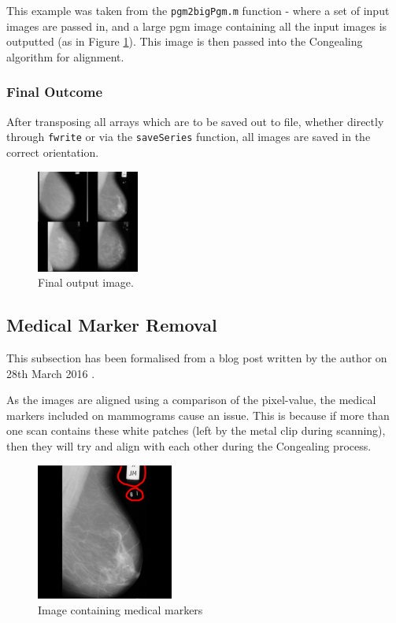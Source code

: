 This example was taken from the \texttt{pgm2bigPgm.m} function - where a set of input images are passed in, and a large pgm image containing all the input images is outputted (as in Figure \ref{fig:final-output-4}). This image is then passed into the \Gls{Congealing} algorithm for alignment.

\subsubsection{Final Outcome}

After transposing all arrays which are to be saved out to file, whether directly through \texttt{fwrite} or via the \texttt{saveSeries} function, all images are saved in the correct orientation.

\begin{figure}[H]
  \centering
  \includegraphics[width=0.3\textwidth]{Chapter2/technical-img/big_scan.jpg}
  \caption{Final output image.}
  \label{fig:final-output-4}
\end{figure}

\newpage
\subsection{Medical Marker Removal}
\label{ssec:marker-removal}

This subsection has been formalised from a blog post written by the author on 28th March 2016 \cite{Collins_2016}.

As the images are aligned using a comparison of the pixel-value, the medical markers included on mammograms cause an issue. This is because if more than one scan contains these white patches (left by the metal clip during scanning), then they will try and align with each other during the \Gls{Congealing} process.

\begin{figure}[H]
  \centering
  \includegraphics[width=0.4\textwidth]{Chapter2/technical-img/mdb196.png}
  \caption{Image containing medical markers}
  \label{fig:med-markers}
\end{figure}

